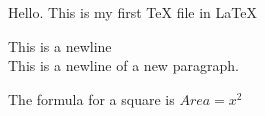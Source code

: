 \documentclass[11pt]{article}
\begin{document}
Hello. This is my first TeX file in \LaTeX\

This is a newline\\
This is a newline of a new paragraph.

The formula for a square is $Area=x^2$
\end{document}

